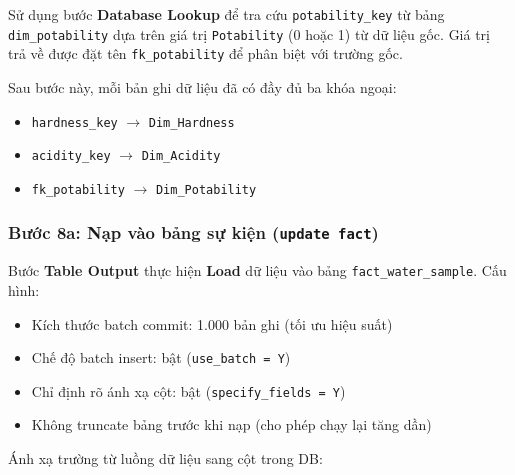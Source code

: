 Sử dụng bước \textbf{Database Lookup} để tra cứu \texttt{potability\_key} từ bảng \texttt{dim\_potability} dựa trên giá trị \texttt{Potability} (0 hoặc 1) từ dữ liệu gốc. Giá trị trả về được đặt tên \texttt{fk\_potability} để phân biệt với trường gốc.

Sau bước này, mỗi bản ghi dữ liệu đã có đầy đủ ba khóa ngoại:
\begin{itemize}
    \item \texttt{hardness\_key} $\rightarrow$ \texttt{Dim\_Hardness}
    \item \texttt{acidity\_key} $\rightarrow$ \texttt{Dim\_Acidity}
    \item \texttt{fk\_potability} $\rightarrow$ \texttt{Dim\_Potability}
\end{itemize}

\subsubsection{Bước 8a: Nạp vào bảng sự kiện (\texttt{update fact})}

Bước \textbf{Table Output} thực hiện \textbf{Load} dữ liệu vào bảng \texttt{fact\_water\_sample}. Cấu hình:
\begin{itemize}
    \item Kích thước batch commit: 1.000 bản ghi (tối ưu hiệu suất)
    \item Chế độ batch insert: bật (\texttt{use\_batch = Y})
    \item Chỉ định rõ ánh xạ cột: bật (\texttt{specify\_fields = Y})
    \item Không truncate bảng trước khi nạp (cho phép chạy lại tăng dần)
\end{itemize}

Ánh xạ trường từ luồng dữ liệu sang cột trong DB:

